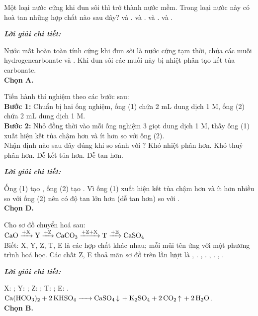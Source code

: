 \documentclass[11pt,a4paper]{article}
\def\loigiai#1{
\par\begingroup\color{blue!80!black}\small
\noindent\textbf{\textit{Lời giải chi tiết:}}\par
#1\par\endgroup}
\begin{document}
\begin{ex}
Một loại nước cứng khi đun sôi thì trở thành nước mềm. Trong loại nước này có hoà tan những hợp chất nào sau đây?
\choice
{\True {} và .}
{ và .}
{ và .}
{ và .}
\loigiai{
Nước mất hoàn toàn tính cứng khi đun sôi là nước cứng tạm thời, chứa các muối hydrogencarbonate \ce{Ca(HCO3)2} và \ce{Mg(HCO3)2}. Khi đun sôi các muối này bị nhiệt phân tạo kết tủa carbonate.\\
\textbf{Chọn A.}}
\end{ex}

\begin{ex}
Tiến hành thí nghiệm theo các bước sau:\\
\textbf{Bước 1:} Chuẩn bị hai ống nghiệm, ống (1) chứa 2 mL dung dịch  1 M, ống (2) chứa 2 mL dung dịch  1 M.\\
\textbf{Bước 2:} Nhỏ đồng thời vào mỗi ống nghiệm 3 giọt dung dịch  1 M, thấy ống (1) xuất hiện kết tủa chậm hơn và ít hơn so với ống (2).\\
Nhận định nào sau đây đúng khi so sánh  với ?
\choice
{Khó nhiệt phân hơn.}
{Khó thuỷ phân hơn.}
{Dễ kết tủa hơn.}
{\True Dễ tan hơn.}
\loigiai{
Ống (1) tạo , ống (2) tạo . Vì ống (1) xuất hiện kết tủa chậm hơn và ít hơn nhiều so với ống (2) nên \ce{CaSO4} có độ tan lớn hơn (dễ tan hơn) so với \ce{BaSO4}.\\
\textbf{Chọn D.}}
\end{ex}

\begin{ex}
Cho sơ đồ chuyển hoá sau:\\
$\ce{CaO} \xrightarrow{+\text{X}} \text{Y} \xrightarrow{+\text{Z}} \ce{CaCO3} \xrightarrow{+\text{Z} + \text{X}} \text{T} \xrightarrow{+\text{E}} \ce{CaSO4}$\\
Biết: X, Y, Z, T, E là các hợp chất khác nhau; mỗi mũi tên ứng với một phương trình hoá học. Các chất Z, E thoả mãn sơ đồ trên lần lượt là
\choice
{, .}
{\True {}, .}
{, .}
{, .}
\loigiai{
X: ; Y: ; Z: \ce{CO2}; T: \ce{Ca(HCO3)2}; E: \ce{KHSO4}.\\
$\ce{Ca(HCO3)2 + 2KHSO4 -> CaSO4 v + K2SO4 + 2CO2 ^ + 2H2O}$.\\
\textbf{Chọn B.}}
\end{ex}
\end{document}
